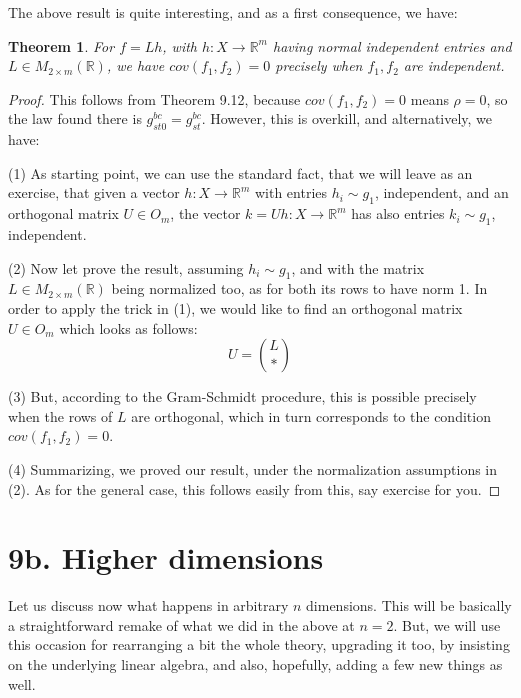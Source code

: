 \documentclass[12pt]{amsbook}
\newtheorem{theorem}{Theorem}[chapter]
\begin{document}
The above result is quite interesting, and as a first consequence, we have:

\begin{theorem}
For $f=Lh$, with $h:X\to\mathbb R^m$ having normal independent entries and $L\in M_{2\times m}(\mathbb R)$, we have $cov(f_1,f_2)=0$ precisely when $f_1,f_2$ are independent.
\end{theorem}

\begin{proof}
This follows from Theorem 9.12, because $cov(f_1,f_2)=0$ means $\rho=0$, so the law found there is $g_{st0}^{bc}=g_{st}^{bc}$. However, this is overkill, and alternatively, we have:

\medskip

(1) As starting point, we can use the standard fact, that we will leave as an exercise, that given a vector $h:X\to\mathbb R^m$ with entries $h_i\sim g_1$, independent, and an orthogonal matrix $U\in O_m$, the vector $k=Uh:X\to\mathbb R^m$ has also entries $k_i\sim g_1$, independent.

\medskip

(2) Now let prove the result, assuming $h_i\sim g_1$, and with the matrix $L\in M_{2\times m}(\mathbb R)$ being normalized too, as for both its rows to have norm 1. In order to apply the trick in (1), we would like to find an orthogonal matrix $U\in O_m$ which looks as follows:
$$U=\binom{L}{*}$$

(3) But, according to the Gram-Schmidt procedure, this is possible precisely when the rows of $L$ are orthogonal, which in turn corresponds to the condition $cov(f_1,f_2)=0$.

\medskip

(4) Summarizing, we proved our result, under the normalization assumptions in (2). As for the general case, this follows easily from this, say exercise for you.
\end{proof}

\section*{9b. Higher dimensions}

Let us discuss now what happens in arbitrary $n$ dimensions. This will be basically a straightforward remake of what we did in the above at $n=2$. But, we will use this occasion for rearranging a bit the whole theory, upgrading it too, by insisting on the underlying linear algebra, and also, hopefully, adding a few new things as well.
\end{document}
